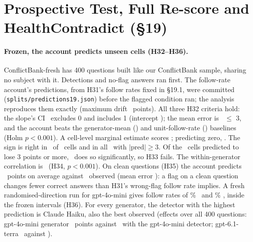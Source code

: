 \section{Prospective Test, Full Re-score and HealthContradict (\S19)}
\label{app:fresh}


\paragraph{Frozen, the account predicts unseen cells (H32--H36).} ConflictBank-fresh has 400 questions
built like our ConflictBank sample, sharing no subject with it. Detections and no-flag answers ran first. The
follow-rate account's predictions, from H31's follow rates fixed in \S19.1, were committed
(\texttt{splits/predictions19.json}) before the flagged condition ran; the analysis reproduces them exactly (maximum
drift \frDrift\ points). All three H32 criteria hold: the slope's CI \frSlopeCI\ excludes 0 and includes 1 (intercept
\frIntercept); the mean error is \frMae\ $\le$ 3, and the account beats the generator-mean (\frMaeGen) and
unit-follow-rate (\frMaeOnes) baselines (Holm $p<0.001$). A cell-level marginal estimate scores \frMaeMarg;
predicting zero, \frMaeZero. The sign is right in \frSignAgree\ of \frN\ cells and in all \frBigN\ with
$|\text{pred}|\ge3$. Of the \frHarmN\ cells predicted to lose 3 points or more, \frHarmConf\ does so significantly, so
H33 fails. The within-generator correlation is \frRWithin\ (H34, $p<0.001$). On clean questions (H35) the account
predicts \frCleanPred\ points on average against \frCleanObs\ observed (mean error \frCleanMae): a flag on a clean
question changes fewer correct answers than H31's wrong-flag follow rate implies. A fresh randomised-direction run for
gpt-4o-mini gives follow rates of \frFollowR\% \frFollowRCI\ and \frFollowW\% \frFollowWCI, inside the frozen
intervals (H36). For every generator, the detector with the highest prediction is Claude Haiku, also the best observed
(effects over all 400 questions: gpt-4o-mini generator \frSelMiniObs\ points against \frMiniDetMiniObs\ with the gpt-4o-mini detector; gpt-6.1-terra
\frSelTerraObs\ against \frMiniDetTerraObs).

